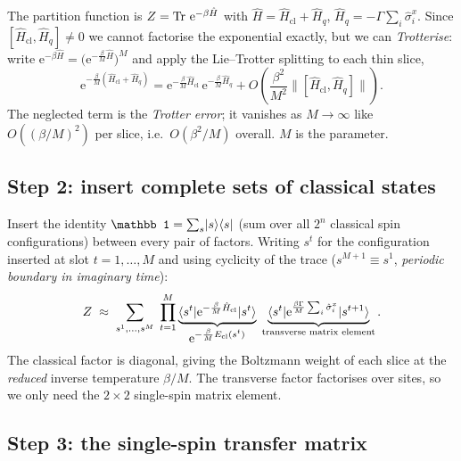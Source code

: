 The partition function is $Z=\operatorname{Tr}\,\mathrm{e}^{-\beta\hat H}$ with
$\hat H=\hat H_{\mathrm{cl}}+\hat H_q$,
$\hat H_q=-\Gamma\sum_i\hat\sigma^x_i$. Since
$[\hat H_{\mathrm{cl}},\hat H_q]\ne0$ we cannot factorise the exponential
exactly, but we can \emph{Trotterise}: write
$\mathrm{e}^{-\beta\hat H}=\bigl(\mathrm{e}^{-\frac{\beta}{M}\hat H}\bigr)^M$
and apply the Lie--Trotter splitting to each thin slice,
\begin{equation}
\mathrm{e}^{-\frac{\beta}{M}(\hat H_{\mathrm{cl}}+\hat H_q)}
=\mathrm{e}^{-\frac{\beta}{M}\hat H_{\mathrm{cl}}}\,
 \mathrm{e}^{-\frac{\beta}{M}\hat H_q}
 +O\!\left(\frac{\beta^2}{M^2}\bigl\|[\hat H_{\mathrm{cl}},\hat H_q]\bigr\|\right).
\label{eq:trotter-split}
\end{equation}
The neglected term is the \emph{Trotter error}; it vanishes as
$M\to\infty$ like $O((\beta/M)^2)$ per slice, i.e.\ $O(\beta^2/M)$ overall.
$M$ is the  parameter.

\subsection{Step 2: insert complete sets of classical states}

Insert the identity
$\mathbb 1=\sum_{s}\ket{s}\bra{s}$ (sum over all $2^n$ classical spin
configurations) between every pair of factors. Writing $s^t$ for the
configuration inserted at slot $t=1,\dots,M$ and using cyclicity of the
trace ($s^{M+1}\equiv s^1$, \emph{periodic boundary in imaginary time}):
\begin{equation}
Z\;\approx\;\sum_{s^1,\dots,s^M}\;\prod_{t=1}^{M}
\underbrace{\langle s^t\rvert\mathrm{e}^{-\frac{\beta}{M}\hat H_{\mathrm{cl}}}\lvert s^t\rangle}_{\displaystyle
\mathrm{e}^{-\frac{\beta}{M}E_{\mathrm{cl}}(s^t)}}
\;\underbrace{\langle s^t\rvert\mathrm{e}^{\frac{\beta\Gamma}{M}\sum_i\hat\sigma^x_i}\lvert s^{t+1}\rangle}_{\text{transverse matrix element}} .
\label{eq:z-inserted}
\end{equation}
The classical factor is diagonal, giving the Boltzmann weight of each slice
at the \emph{reduced} inverse temperature $\beta/M$. The transverse factor
factorises over sites, so we only need the $2\times2$ single-spin matrix
element.

\subsection{Step 3: the single-spin transfer matrix}

